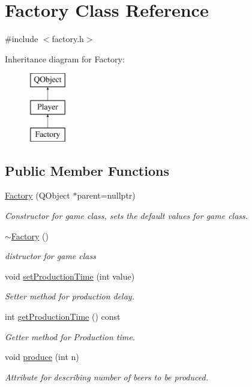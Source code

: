 \hypertarget{class_factory}{}\section{Factory Class Reference}
\label{class_factory}


{\ttfamily \#include $<$factory.\+h$>$}

Inheritance diagram for Factory\+:\begin{figure}[H]
\begin{center}
\leavevmode
\includegraphics[height=3.000000cm]{class_factory}
\end{center}
\end{figure}
\subsection*{Public Member Functions}
\begin{DoxyCompactItemize}
\item 
\hyperlink{class_factory_a32bc190034f66d7e495cbcc4a7dfad30}{Factory} (Q\+Object $\ast$parent=nullptr)
\begin{DoxyCompactList}\small\item\em Constructor for game class, sets the default values for game class. \end{DoxyCompactList}\item 
\hyperlink{class_factory_a8f71456f48e4df402c778a44191ff40e}{$\sim$\+Factory} ()
\begin{DoxyCompactList}\small\item\em distructor for game class \end{DoxyCompactList}\item 
void \hyperlink{class_factory_a8567550501860453df05d6afae963997}{set\+Production\+Time} (int value)
\begin{DoxyCompactList}\small\item\em Setter method for production delay. \end{DoxyCompactList}\item 
int \hyperlink{class_factory_a7020f06a3b9045d0902cd3740796ded5}{get\+Production\+Time} () const
\begin{DoxyCompactList}\small\item\em Getter method for Production time. \end{DoxyCompactList}\item 
void \hyperlink{class_factory_a321703fafe2a870260e04b848aa565d2}{produce} (int n)
\begin{DoxyCompactList}\small\item\em Attribute for describing number of beers to be produced. \end{DoxyCompactList}\end{DoxyCompactItemize}
